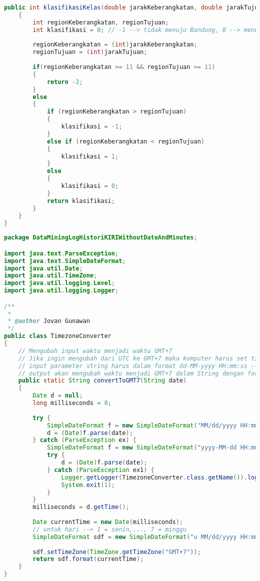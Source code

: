 \begin{lstlisting}[language=Java,basicstyle=\tiny,caption=ProcessingData.java]
    public int klasifikasiKelas(double jarakKeberangkatan, double jarakTujuan)
    {
        int regionKeberangkatan, regionTujuan;
        int klasifikasi = 0; // -1 --> tidak menuju Bandung, 0 --> menuju Bandung, 1 --> menuju region yang sama
        
        regionKeberangkatan = (int)jarakKeberangkatan;
        regionTujuan = (int)jarakTujuan;
        
        if(regionKeberangkatan >= 11 && regionTujuan >= 11)
        {
            return -2;
        }
        else
        {
            if (regionKeberangkatan > regionTujuan)
            {
                klasifikasi = -1;
            }
            else if (regionKeberangkatan < regionTujuan)
            {
                klasifikasi = 1;
            }
            else
            {
                klasifikasi = 0;
            }
            return klasifikasi;
        }
    }
}
\end{lstlisting}

\begin{lstlisting}[language=Java,basicstyle=\tiny,caption=TimezoneConverter.java]
package DataMiningLogHistoriKIRIWithoutDateAndMinutes;

import java.text.ParseException;
import java.text.SimpleDateFormat;
import java.util.Date;
import java.util.TimeZone;
import java.util.logging.Level;
import java.util.logging.Logger;

/**
 *
 * @author Jovan Gunawan
 */
public class TimezoneConverter 
{
    // Mengubah input waktu menjadi waktu GMT+7
    // Jika ingin mengubah dari UTC ke GMT+7 maka komputer harus set timezone ke UTC
    // input parameter string harus dalam format dd-MM-yyyy HH:mm:ss --> contoh 1/1/2014  3:51:15 AM
    // output akan mengubah waktu menjadi GMT+7 dalam String dengan format EEE MM/dd/yyyy HH:mm:ss --> contoh Wed 01/01/2014 03:51:15
    public static String convertToGMT7(String date)
    {
        Date d = null;
        long milliseconds = 0;
        
        try {
            SimpleDateFormat f = new SimpleDateFormat("MM/dd/yyyy HH:mm");
            d = (Date)f.parse(date);
        } catch (ParseException ex) {
            SimpleDateFormat f = new SimpleDateFormat("yyyy-MM-dd HH:mm:ss");
            try {
                d = (Date)f.parse(date);
            } catch (ParseException ex1) {
                Logger.getLogger(TimezoneConverter.class.getName()).log(Level.SEVERE, null, ex);
                System.exit(1);
            }
        }
        milliseconds = d.getTime();
        
        Date currentTime = new Date(milliseconds);
        // untuk hari --> 1 = senin,..., 7 = minggu
        SimpleDateFormat sdf = new SimpleDateFormat("u MM/dd/yyyy HH:mm:ss");
        
        sdf.setTimeZone(TimeZone.getTimeZone("GMT+7"));
        return sdf.format(currentTime);
    }
}
\end{lstlisting}

